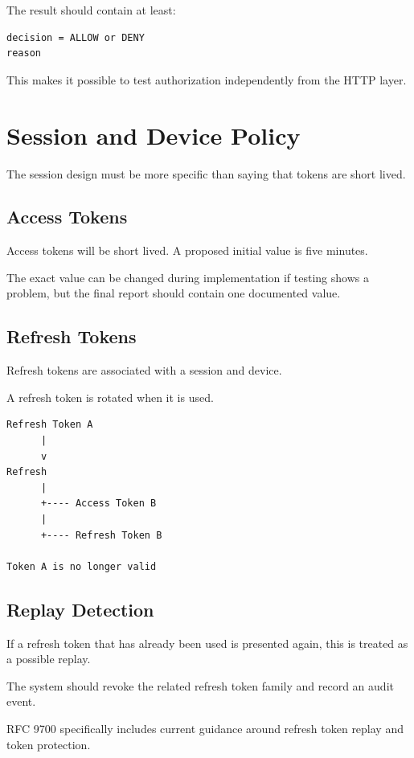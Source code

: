 \documentclass[11pt,a4paper]{article}
\begin{document}
The result should contain at least:

\begin{verbatim}
decision = ALLOW or DENY
reason
\end{verbatim}

This makes it possible to test authorization independently from the HTTP layer.

\section{Session and Device Policy}

The session design must be more specific than saying that tokens are short lived.

\subsection{Access Tokens}

Access tokens will be short lived. A proposed initial value is five minutes.

The exact value can be changed during implementation if testing shows a problem, but the final report should contain one documented value.

\subsection{Refresh Tokens}

Refresh tokens are associated with a session and device.

A refresh token is rotated when it is used.

\begin{verbatim}
Refresh Token A
      |
      v
Refresh
      |
      +---- Access Token B
      |
      +---- Refresh Token B

Token A is no longer valid
\end{verbatim}

\subsection{Replay Detection}

If a refresh token that has already been used is presented again, this is treated as a possible replay.

The system should revoke the related refresh token family and record an audit event.

RFC 9700 specifically includes current guidance around refresh token replay and token protection. \cite{rfc9700}
\end{document}
